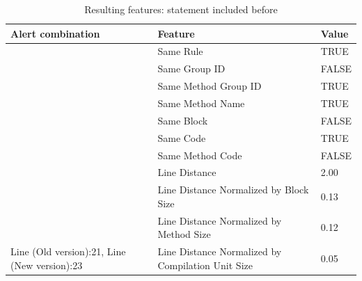 \documentclass[
]{article}
\begin{document}
\begin{table}[!h]

\caption{\label{tab:unnamed-chunk-18}Resulting features: statement included before \label{nested_in_other_if} }
\centering
\begin{tabular}[t]{l|l|l}
\hline
Alert combination & Feature & Value\\
\hline
\rowcolor{gray!6}   & Same Rule & TRUE\\

 & Same Group ID & FALSE\\

\rowcolor{gray!6}   & Same Method Group ID & TRUE\\

 & Same Method Name & TRUE\\

\rowcolor{gray!6}   & Same Block & FALSE\\

 & Same Code & TRUE\\

\rowcolor{gray!6}   & Same Method Code & FALSE\\

 & Line Distance & 2.00\\

\rowcolor{gray!6}   & Line Distance Normalized by Block Size & 0.13\\

 & Line Distance Normalized by Method Size & 0.12\\

\multirow[t]{-11}{*}{\raggedright\arraybackslash Line (Old version):21, Line (New version):23} & Line Distance Normalized by Compilation Unit Size & 0.05\\
\hline
\end{tabular}
\end{table}

\normalsize

\newpage
\end{document}
